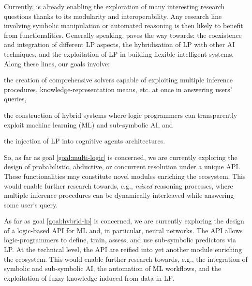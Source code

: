 \documentclass[12pt,a4paper,openright,twoside]{book}
\begin{document}
Currently, \twopkt{} is already enabling the exploration of many interesting research questions thanks to its modularity and interoperability.
%
Any research line involving symbolic manipulation or automated reasoning is then likely to benefit from \twopkt{} functionalities.
%
Generally speaking, \twopkt{} paves the way towards:
%
    the coexistence and integration of different LP aspects,
    the hybridisation of LP with other AI techniques, and
    the exploitation of LP in building flexible intelligent systems.
%
Along these lines, our goals involve:
%
\begin{inlinelist}
    \item\label{goal:multi-logic} the creation of comprehensive solvers capable of exploiting multiple inference procedures, knowledge-representation means, etc. at once in answering users' queries,
    \item\label{goal:hybrid-lp} the construction of hybrid systems where logic programmers can transparently exploit machine learning (ML) and sub-symbolic AI, and
    \item\label{goal:lp-and-mas} the injection of LP into cognitive agents architectures.
\end{inlinelist}

So, as far as goal \ref{goal:multi-logic} is concerned, we are currently exploring the design of probabilistic, abductive, or concurrent resolution under a unique API.
%
These functionalities may constitute novel modules enriching the \twopkt{} ecosystem.
%
This would enable further research towards, e.g., \emph{mixed} reasoning processes, where multiple inference procedures can be dynamically interleaved while answering some user's query.

As far as goal \ref{goal:hybrid-lp} is concerned, we are currently exploring the design of a logic-based API for ML and, in particular, neural networks.
%
The API allows logic-programmers to define, train, assess, and use sub-symbolic predictors via LP.
%
At the technical level, the API are reified into yet another module enriching the \twopkt{} ecosystem.
%
This would enable further research towards, e.g., the integration of symbolic and sub-symbolic AI, the automation of ML workflows, and the exploitation of fuzzy knowledge induced from data in LP.
\end{document}
